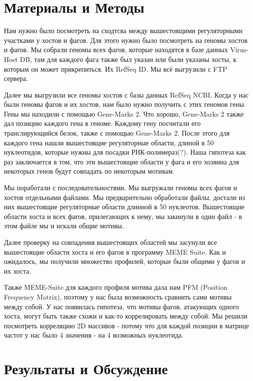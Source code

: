 \documentclass[a4paper,12pt]{article}
\begin{document}
\section{Материалы и Методы} \label{sec:code}
\par{}
Нам нужно было посмотреть на сходтсва между вышестоящими регуляторными участками у хостов и фагов. Для этого нужно было посмотреть на геномы хостов и фагов. Мы собрали геномы всех фагов, которые находятся в базе данных Virus-Host DB, там для каждого фага также был указан или были указаны хосты, к которым он может прикрепиться. Их RefSeq ID. Мы всё выгрузили с FTP сервера.
\par{}
Далее мы выгрузили все геномы хостов с базы данных RefSeq NCBI. Когда у нас были геномы фагов и их хостов, нам было нужно получить с этих геномов гены. Гены мы находили с помощью Gene-Marks 2. Что хорошо, Gene-Marks 2 также дал позицию каждого гена в геноме. Каждому гену посчитали его транслирующийся белок, также с помощью Gene-Marks 2. После этого для каждого гена нашли вышестоящие регуляторные области, длиной в 50 нуклеотидов, которые нужны для посадки РНК-полимераз(?). Наша гипотеза как раз заключается в том, что эти вышестоящие области у фага и его хозяина для некоторых генов будут совпадать по некоторым мотивам.
\par{}
Мы поработали с последовательностями. Мы выгружали геномы всех фагов и хостов отдельными файлами. Мы предварительно обработали файлы, достали из них вышестоящие регуляторные области длинной в 50 нуклеотов. Вышестоящие области хоста и всех фагов, прилегающих к нему, мы закинули в один файл - в этом файле мы и искали общие мотивы.
\par{}
Далее проверку на совпадения вышестоящих областей мы засунули все вышестоящие области хоста и его фагов в программу MEME Suite. Как и ожидалось, мы получили множество профилей, которые были общими у фагов и их хоста. 
\par{}
Также MEME-Suite для каждого профиля мотива дала нам PFM (Position Frequency Matrix), поэтому у нас была возможность сравнить сами мотивы между собой. У нас появилась гипотеза, что мотивы фагов, атакующих одного хоста, могут быть также схожи и как-то коррелировать между собой. Мы решили посмотреть корреляцию 2D массивов - потому что для каждой позиции в матрице частот у нас было 4 значения - на 4 возможных нуклеотида.

\newpage
\section{Результаты и Обсуждение}
\end{document}
